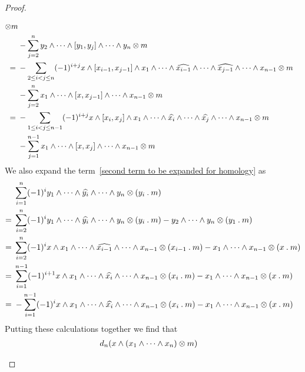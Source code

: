 \begin{proof}
\begin{enumerate}
\begin{align*}
				\otimes m
				\\
				{}&
				-
				\sum_{j=2}^n
				y_2 \wedge \dotsb \wedge [y_1, y_j] \wedge \dotsb \wedge y_n
				\otimes m
				\\
				={}&
				-
				\sum_{2 \leq i < j \leq n}
				(-1)^{i + j}
				x \wedge [x_{i-1}, x_{j-1}] \wedge x_1 \wedge \dotsb \wedge \widehat{x_{i-1}} \wedge \dotsb \wedge \widehat{x_{j-1}} \wedge \dotsb \wedge x_{n-1}
				\otimes m
				\\
				{}&
				-
				\sum_{j=2}^n
				x_1 \wedge \dotsb \wedge [x, x_{j-1}] \wedge \dotsb \wedge x_{n-1}
				\otimes m
				\\
				={}&
				-
				\sum_{1 \leq i < j \leq n-1}
				(-1)^{i + j}
				x \wedge [x_i, x_j] \wedge x_1 \wedge \dotsb \wedge \widehat{x_i} \wedge \dotsb \wedge \widehat{x_j} \wedge \dotsb \wedge x_{n-1}
				\otimes m
				\\
				{}&
				-
				\sum_{j=1}^{n-1}
				x_1 \wedge \dotsb \wedge [x, x_j] \wedge \dotsb \wedge x_{n-1}
				\otimes m
			\end{align*}
			\endgroup
			We also expand the term~\eqref{second term to be expanded for homology} as
			\begin{align*}
				{}&
				\sum_{i=1}^n
				(-1)^i
				y_1 \wedge \dotsb \wedge \widehat{y_i} \wedge \dotsb \wedge y_n \otimes (y_i \mathbin{.} m)
				\\
				={}&
				\sum_{i=2}^n
				(-1)^i
				y_1 \wedge \dotsb \wedge \widehat{y_i} \wedge \dotsb \wedge y_n \otimes (y_i \mathbin{.} m)
				-
				y_2 \wedge \dotsb \wedge y_n \otimes (y_1 \mathbin{.} m)
				\\
				={}&
				\sum_{i=2}^n
				(-1)^i
				x \wedge x_1 \wedge \dotsb \wedge \widehat{x_{i-1}} \wedge \dotsb \wedge x_{n-1} \otimes (x_{i-1} \mathbin{.} m)
				-
				x_1 \wedge \dotsb \wedge x_{n-1} \otimes (x \mathbin{.} m)
				\\
				={}&
				\sum_{i=1}^{n-1}
				(-1)^{i+1}
				x \wedge x_1 \wedge \dotsb \wedge \widehat{x_i} \wedge \dotsb \wedge x_{n-1} \otimes (x_i \mathbin{.} m)
				-
				x_1 \wedge \dotsb \wedge x_{n-1} \otimes (x \mathbin{.} m)
				\\
				={}&
				-
				\sum_{i=1}^{n-1}
				(-1)^i
				x \wedge x_1 \wedge \dotsb \wedge \widehat{x_i} \wedge \dotsb \wedge x_{n-1} \otimes (x_i \mathbin{.} m)
				-
				x_1 \wedge \dotsb \wedge x_{n-1} \otimes (x \mathbin{.} m)
			\end{align*}
			Putting these calculations together we find that
			\begingroup
			\allowdisplaybreaks
			\begin{align*}
				{}&
				d_n( x \wedge (x_1 \wedge \dotsb \wedge x_n) \tensor m )

\end{align*}
\end{enumerate}
\end{proof}
